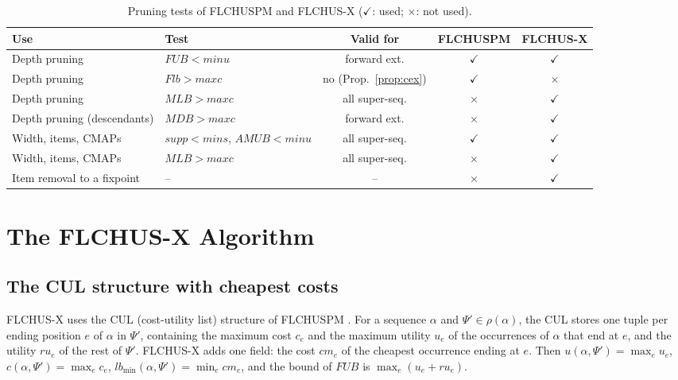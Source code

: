 \documentclass[pdflatex,sn-mathphys,Numbered]{sn-jnl}
\theoremstyle{thmstyleone}
\theoremstyle{thmstyletwo}
\theoremstyle{thmstylethree}
\newcommand{\FL}{\textsc{FLCHUSPM}}
\newcommand{\FX}{\textsc{FLCHUS-X}}
\newcommand{\amub}{\ensuremath{\mathit{AMUB}}}
\newcommand{\fub}{\ensuremath{\mathit{FUB}}}
\newcommand{\flb}{\ensuremath{\mathit{Flb}}}
\newcommand{\mlb}{\ensuremath{\mathit{MLB}}}
\newcommand{\mdb}{\ensuremath{\mathit{MDB}}}
\newcommand{\supp}{\ensuremath{\mathit{supp}}}
\newcommand{\lbmin}{\ensuremath{\mathit{lb}_{\min}}}
\newcommand{\minu}{\ensuremath{\mathit{minu}}}
\newcommand{\maxc}{\ensuremath{\mathit{maxc}}}
\newcommand{\mins}{\ensuremath{\mathit{mins}}}
\begin{document}
\begin{table}[t]
\centering
\caption{Pruning tests of \FL{} and \FX{} ($\checkmark$: used; $\times$: not used).}
\label{tab:tests}
\setlength{\tabcolsep}{4pt}
{\footnotesize\begin{tabular}{@{}llccc@{}}
\toprule
Use & Test & Valid for & \FL{} & \FX{} \\
\midrule
Depth pruning & $\fub < \minu$ & forward ext. & $\checkmark$ & $\checkmark$ \\
Depth pruning & $\flb > \maxc$ & \textcolor{badc}{no (Prop.~\ref{prop:cex})} & $\checkmark$ & $\times$ \\
Depth pruning & $\mlb > \maxc$ & all super-seq. & $\times$ & $\checkmark$ \\
Depth pruning (descendants) & $\mdb > \maxc$ & forward ext. & $\times$ & $\checkmark$ \\
Width, items, CMAPs & $\supp < \mins$, $\amub < \minu$ & all super-seq. & $\checkmark$ & $\checkmark$ \\
Width, items, CMAPs & $\mlb > \maxc$ & all super-seq. & $\times$ & $\checkmark$ \\
Item removal to a fixpoint & -- & -- & $\times$ & $\checkmark$ \\
\bottomrule
\end{tabular}}
\end{table}

\section{The FLCHUS-X Algorithm}\label{sec:algo}

\subsection{The CUL structure with cheapest costs}

\FX{} uses the CUL (cost-utility list) structure of \FL{} \cite[Section~5.1]{truong2022}. For a
sequence $\alpha$ and $\Psi' \in \rho(\alpha)$, the CUL stores one tuple per ending position
$e$ of $\alpha$ in $\Psi'$, containing the maximum cost $c_e$ and the maximum utility $u_e$ of
the occurrences of $\alpha$ that end at $e$, and the utility $\mathit{ru}_e$ of the rest of
$\Psi'$. \FX{} adds one field: the cost $\mathit{cm}_e$ of the cheapest occurrence ending at
$e$. Then $u(\alpha,\Psi') = \max_e u_e$, $c(\alpha,\Psi') = \max_e c_e$,
$\lbmin(\alpha,\Psi') = \min_e \mathit{cm}_e$, and the bound of \fub{} is
$\max_e (u_e + \mathit{ru}_e)$.
\end{document}
